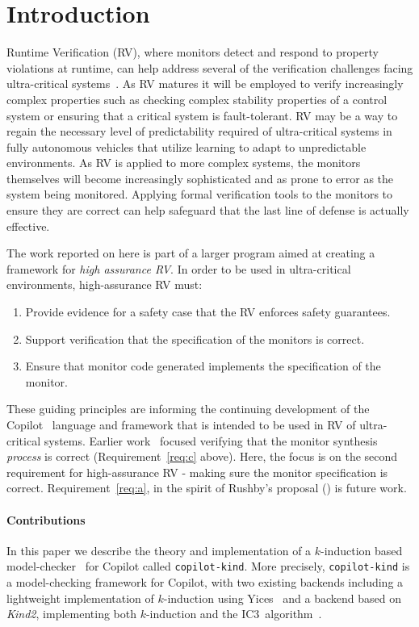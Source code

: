 \section{Introduction}\label{sec:intro}
Runtime Verification (RV), where monitors detect and respond to
property violations at runtime, can help address several of the
verification challenges facing ultra-critical
systems~\cite{pike-rv-11,rvRushby}.  As RV matures it will be employed to
verify increasingly complex properties such as checking complex
stability properties of a control system or ensuring that a critical
system is fault-tolerant. RV may be a
way to regain the necessary level of predictability required of
ultra-critical systems  in fully autonomous vehicles that
utilize learning to adapt to unpredictable environments.  As RV is applied to more complex systems, the
monitors themselves will become increasingly sophisticated and as prone to error
as the system being monitored.  Applying formal verification
tools to the monitors to ensure they are correct can help safeguard
that the last line of defense is actually effective.

 The work reported on here is part of a larger
program aimed at creating a framework for \emph{high assurance RV}. In
order to be used in ultra-critical environments, high-assurance RV
must:
\begin{enumerate}
\item \label{req:a} Provide evidence for a safety case that the RV enforces safety guarantees.
\item \label{req:b} Support verification that the specification of the monitors
  is correct.
\item \label{req:c} Ensure that monitor code generated implements the specification of the
monitor.
\end{enumerate}

\noindent
These guiding principles are informing the continuing development of the
Copilot~\cite{copilot,pike-isse-13} language and framework that is intended to
be used in RV of ultra-critical systems.  Earlier work~\cite{pike-icfp-12}
focused verifying that the monitor synthesis \emph{process} is correct
(Requirement~\ref{req:c} above). Here, the focus
is on the second requirement for high-assurance RV - making sure the monitor
specification is correct. Requirement~\ref{req:a}, in the spirit of Rushby's
proposal (\cite{rvRushby}) is future work.

\paragraph{Contributions}
In this paper we describe the theory and implementation of a $k$-induction based
model-checker~\cite{Sheeran00,EenS03} for Copilot called
\texttt{copilot-kind}. More precisely, \texttt{copilot-kind} is a model-checking
framework for Copilot, with two existing backends including a lightweight
implementation of $k$-induction using Yices~\cite{Dutertre:cav2014} and a backend based on
\emph{Kind2}, implementing both $k$-induction and the IC3~algorithm~\cite{Somenzi-FMCAD11}.

